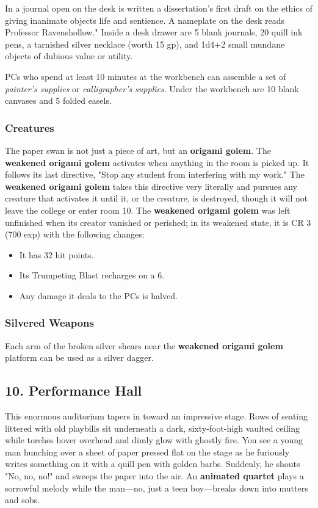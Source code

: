 \documentclass[10pt,a4paper,twoside,bg=print,twocolumn,openany,nodeprecatedcode]{dndbook}
\begin{document}
In a journal open on the desk is written a dissertation's first draft on the ethics of giving inanimate objects life and sentience. A nameplate on the desk reads Professor Ravenshollow." Inside a desk drawer are 5 blank journals, 20 quill ink pens, a tarnished silver necklace (worth 15 gp), and 1d4+2 small mundane objects of dubious value or utility.

PCs who spend at least 10 minutes at the workbench can assemble a set of \textit{painter's supplies} or \textit{calligrapher's supplies}. Under the workbench are 10 blank canvases and 5 folded easels.

\subsubsection{Creatures}
The paper swan is not just a piece of art, but an \textbf{origami golem}. The \textbf{weakened origami golem} activates when anything in the room is picked up. It follows its last directive, "Stop any student from interfering with my work." The \textbf{weakened origami golem} takes this directive very literally and pursues any creature that activates it until it, or the creature, is destroyed, though it will not leave the college or enter room 10. The \textbf{weakened origami golem} was left unfinished when its creator vanished or perished; in its weakened state, it is CR 3 (700 exp) with the following changes:


\begin{itemize}
\item It has 32 hit points.
\item Its Trumpeting Blast recharges on a 6.
\item Any damage it deals to the PCs is halved.
\end{itemize}

\subsubsection{Silvered Weapons}
Each arm of the broken silver shears near the \textbf{weakened origami golem} platform can be used as a silver dagger.

\subsection{10. Performance Hall}
\begin{DndReadAloud}{}
This enormous auditorium tapers in toward an impressive stage. Rows of seating littered with old playbills sit underneath a dark, sixty-foot-high vaulted ceiling while torches hover overhead and dimly glow with ghostly fire. You see a young man hunching over a sheet of paper pressed flat on the stage as he furiously writes something on it with a quill pen with golden barbs. Suddenly, he shouts "No, no, no!" and sweeps the paper into the air. An \textbf{animated quartet} plays a sorrowful melody while the man—no, just a teen boy—breaks down into mutters and sobs.

\end{DndReadAloud}
\end{document}
